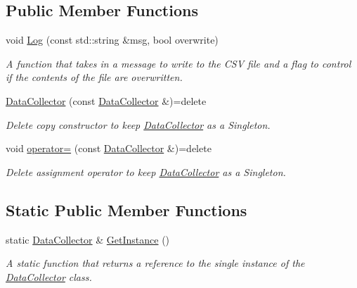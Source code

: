 \subsection*{Public Member Functions}
\begin{DoxyCompactItemize}
\item 
void \hyperlink{classDataCollector_af7d41172cc49dfb689ba91cf2171a5e8}{Log} (const std\+::string \&msg, bool overwrite)
\begin{DoxyCompactList}\small\item\em A function that takes in a message to write to the C\+SV file and a flag to control if the contents of the file are overwritten. \end{DoxyCompactList}\item 
\mbox{\label{classDataCollector_a88476cb5acca163870167efd5179f253}} 
\hyperlink{classDataCollector_a88476cb5acca163870167efd5179f253}{Data\+Collector} (const \hyperlink{classDataCollector}{Data\+Collector} \&)=delete
\begin{DoxyCompactList}\small\item\em Delete copy constructor to keep \hyperlink{classDataCollector}{Data\+Collector} as a Singleton. \end{DoxyCompactList}\item 
\mbox{\label{classDataCollector_a54763523f38fd4bd3f15b84a35ae8efb}} 
void \hyperlink{classDataCollector_a54763523f38fd4bd3f15b84a35ae8efb}{operator=} (const \hyperlink{classDataCollector}{Data\+Collector} \&)=delete
\begin{DoxyCompactList}\small\item\em Delete assignment operator to keep \hyperlink{classDataCollector}{Data\+Collector} as a Singleton. \end{DoxyCompactList}\end{DoxyCompactItemize}
\subsection*{Static Public Member Functions}
\begin{DoxyCompactItemize}
\item 
static \hyperlink{classDataCollector}{Data\+Collector} \& \hyperlink{classDataCollector_aa1cf25c127a7261ccaae4fac0fc5645b}{Get\+Instance} ()
\begin{DoxyCompactList}\small\item\em A static function that returns a reference to the single instance of the \hyperlink{classDataCollector}{Data\+Collector} class. \end{DoxyCompactList}\end{DoxyCompactItemize}


